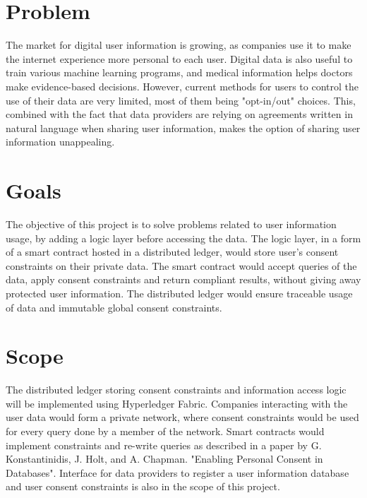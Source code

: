 \documentclass{exsheetSoton}
\begin{document}
    \section{Problem}
        The market for digital user information is growing, as companies use it to make the internet experience more personal to each user. Digital data is also useful to train various machine learning programs, and medical information helps doctors make evidence-based decisions. However, current methods for users to control the use of their data are very limited, most of them being "opt-in/out" choices. This, combined with the fact that data providers are relying on agreements written in natural language when sharing user information, makes the option of sharing user information unappealing.


    \section{Goals}
        The objective of this project is to solve problems related to user information usage, by adding a logic layer before accessing the data. The logic layer, in a form of a smart contract hosted in a distributed ledger, would store user's consent constraints on their private data. The smart contract would accept queries of the data, apply consent constraints and return compliant results, without giving away protected user information. The distributed ledger would ensure traceable usage of data and immutable global consent constraints.


    \section{Scope}
        The distributed ledger storing consent constraints and information access logic will be implemented using Hyperledger Fabric. Companies interacting with the user data would form a private network, where consent constraints would be used for every query done by a member of the network. Smart contracts would implement constraints and re-write queries as described in a paper by G. Konstantinidis, J. Holt, and A. Chapman. "Enabling Personal Consent in Databases". Interface for data providers to register a user information database and user consent constraints is also in the scope of this project.
    
            
                
\end{document}
